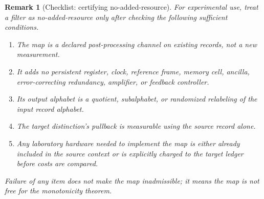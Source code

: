 \documentclass[11pt]{article}
\newtheorem{remark}[theorem]{Remark}
\begin{document}
\begin{remark}[Checklist: certifying no-added-resource]\label{check:no-added-resource}
For experimental use, treat a filter as no-added-resource only after checking the following sufficient conditions.
\begin{enumerate}[label=(\roman*),leftmargin=2em]
\item The map is a declared post-processing channel on existing records, not a new measurement.
\item It adds no persistent register, clock, reference frame, memory cell, ancilla, error-correcting redundancy, amplifier, or feedback controller.
\item Its output alphabet is a quotient, subalphabet, or randomized relabeling of the input record alphabet.
\item The target distinction's pullback is measurable using the source record alone.
\item Any laboratory hardware needed to implement the map is either already included in the source context or is explicitly charged to the target ledger before costs are compared.
\end{enumerate}
Failure of any item does not make the map inadmissible; it means the map is not free for the monotonicity theorem.
\end{remark}
\end{document}
